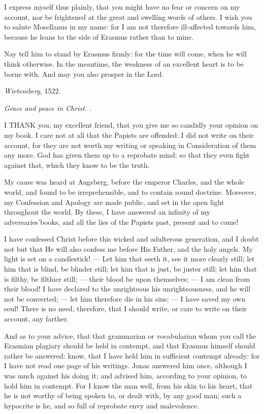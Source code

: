 I express myself thus plainly, that you might have no fear or concern on my account, nor be frightened at the great and swelling words of others. I wish you to salute Mosellanus in my name: for I am not therefore ill-affected towards him, because he leans to the side of Erasmus rather than to mine.

Nay tell him to stand by Erasmus firmly: for the time will come, when he will think otherwise. In the meantime, the weakness of an excellent heart is to be borne with. And may you also prosper in the Lord.

\emph{Wirtemberg, }1522.


\emph{Grace and peace in Christ.} .

I \textsc{THANK} you, my excellent friend, that you give me so candidly your opinion on my book. I care not at all that the Papists are offended: I did not write on their account, for they are not worth my writing or speaking in Consideration of them any more. God has given them up to a reprobate mind; so that they even fight against that, which they know to be the truth.

My cause was heard at Augsberg, before the emperor Charles, and the whole world, and found to be irreprehensible, and to contain sound doctrine. Moreover, my Confession and Apology are made public, and set in the open light throughout the world. By these, I have answered an infinity of my adversaries’books, and all the lies of the Papists past, present and to come!

I have confessed Christ before this wicked and adulterous generation, and I doubt not but that He will also confess me before His Father, and the holy angels. My light is set on a candlestick! — Let him that seeth it, see it more clearly still; let him that is blind, be blinder still; let him that is just, be juster still; let him that is filthy, be filthier still; — their blood be upon themselves; — I am clean from their blood! I have declared to the unrighteous his unrighteousness, and he will not be converted; — let him therefore die in his sins; — I have saved my own soul! There is no need, therefore, that I should write, or care to write on their account, any farther.

And as to your advice, that that grammarian or vocabularian whom you call the Erasmian plagiary should be held in contempt, and that Erasmus himself should rather be answered: know, that I have held him in sufficient contempt already: for I have not read one page of his writings. Jonas answered him once, although I was much against his doing it; and advised him, according to your opinion, to hold him in contempt. For I know the man well, from his skin to his heart, that he is not worthy of being spoken to, or dealt with, by any good man; such a hypocrite is he, and so full of reprobate envy and malevolence.

